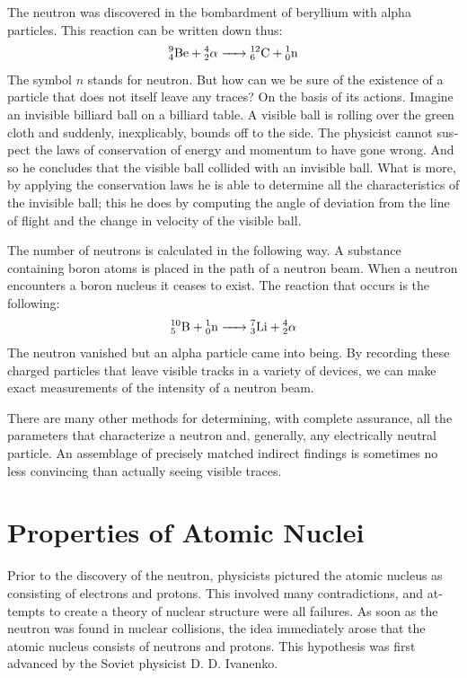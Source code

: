 The neutron was discovered in the bombardment of beryllium with alpha particles. This reaction can be writ­ten down thus:
\begin{equation*}%
\ce{{^{9}_{4}Be} + {^{4}_{2}\alpha} -> {^{12}_{6}C} + {^{1}_{0}n}}
\end{equation*}
The symbol $n$ stands for neutron. But how can we be sure of the existence of a particle that does not itself leave any traces? On the basis of its actions. Imagine an invisible billiard ball on a billiard table. A visible ball is rolling over the green cloth and suddenly, inexplica­bly, bounds off to the side. The physicist cannot sus­pect the laws of conservation of energy and momentum to have gone wrong. And so he concludes that the visible ball collided with an invisible ball. What is more, by applying the conservation laws he is able to determine all the characteristics of the invisible ball; this he does by computing the angle of deviation from the line of flight and the change in velocity of the visible ball.

The number of neutrons is calculated in the following way. A substance containing boron atoms is placed in the path of a neutron beam. When a neutron encounters a boron nucleus it ceases to exist. The reaction that occurs is the following:
\begin{equation*}%
\ce{{^{10}_{5}B} + {^{1}_{0}n} -> {^{7}_{3}Li} + {^{4}_{2}\alpha}}
\end{equation*}
The neutron vanished but an alpha particle came into being. By recording these charged particles that leave visible tracks in a variety of devices, we can make exact measurements of the intensity of a neutron beam.

There are many other methods for determining, with complete assurance, all the parameters that characterize a neutron and, generally, any electrically neutral particle. An assemblage of precisely matched indirect findings is sometimes no less convincing than actually seeing visible traces.

\section{Properties of Atomic Nuclei}

Prior to the discovery of the neutron, physicists pic­tured the atomic nucleus as consisting of electrons and protons. This involved many contradictions, and at­tempts to create a theory of nuclear structure were all failures. As soon as the neutron was found in nuclear collisions, the idea immediately arose that the atomic nucleus consists of neutrons and protons. This hypothesis was first advanced by the Soviet physicist D. D. Iva­nenko.


